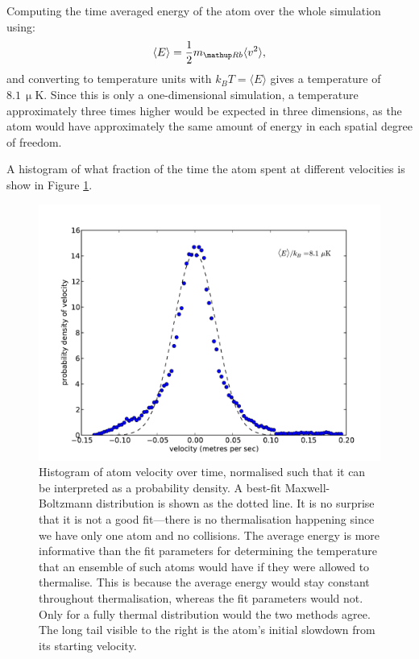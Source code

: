Computing the time averaged energy of the atom over the whole simulation using:
\begin{equation}
\langle E \rangle = \frac12 m_\up{Rb} \langle v^2 \rangle,
\end{equation}
and converting to temperature units with $k_B T = \langle E \rangle$ gives a temperature of $8.1\,\upmu$K. Since this is only a one-dimensional simulation, a temperature approximately three times higher would be expected in three dimensions, as the atom would have approximately the same amount of energy in each spatial degree of freedom.

A histogram of what fraction of the time the atom spent at different velocities is show in Figure \ref{fig:cold_atom}.

\begin{figure}
\begin{center}
\includegraphics[width=\textwidth]{figures/unsorted/cold_atom.pdf}
\caption{\label{fig:cold_atom} Histogram of atom velocity over time, normalised such that it can be interpreted as a probability density. A best-fit Maxwell-Boltzmann distribution is shown as the dotted line. It is no surprise that it is not a good fit---there is no thermalisation happening since we have only one atom and no collisions. The average energy is more informative than the fit parameters for determining the temperature that an ensemble of such atoms would have if they were allowed to thermalise. This is because the average energy would stay constant throughout thermalisation, whereas the fit parameters would not. Only for a fully thermal distribution would the two methods agree. The long tail visible to the right is the atom's initial slowdown from its starting velocity.}
\end{center}
\end{figure}

